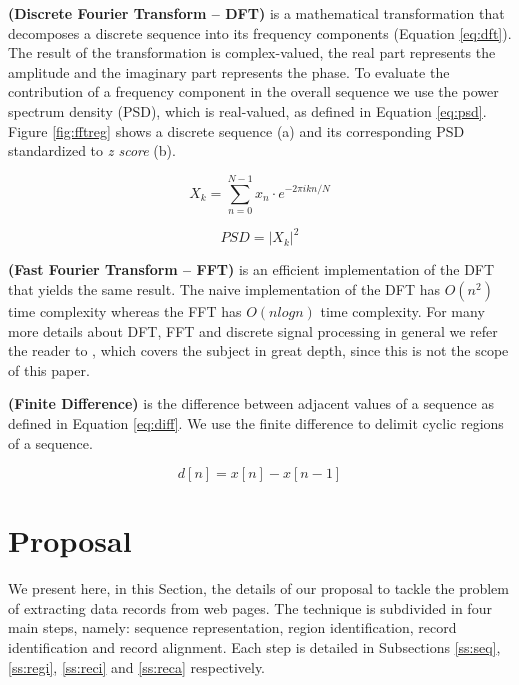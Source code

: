 \documentclass{vldb}
\begin{document}
\begin{definition}\textbf{(Discrete Fourier Transform -- DFT)} is a mathematical
transformation that decomposes a discrete sequence into its frequency components
(Equation \ref{eq:dft}). The result of the transformation is complex-valued, the
real part represents the amplitude and the imaginary part represents the phase.
To evaluate the contribution of a frequency component in the overall sequence we
use the power spectrum density (PSD), which is real-valued, as defined in
Equation \ref{eq:psd}.
Figure \ref{fig:fftreg} shows a discrete sequence (a) and its corresponding PSD
standardized to \textit{z score} (b).

\begin{equation}\label{eq:dft}
    X_k=\sum_{n=0}^{N-1}{x_n\cdot e^{-2\pi ikn/N}}    
\end{equation}

\begin{equation}\label{eq:psd}
    PSD=|X_k|^2
\end{equation}

\end{definition}

\begin{definition}\textbf{(Fast Fourier Transform -- FFT)}\label{def:fft} is an
efficient implementation of the DFT that yields the same result. The naive implementation
of the DFT has $O(n^2)$ time complexity whereas the FFT has $O(nlogn)$ time
complexity. For many more details about DFT, FFT and discrete signal
processing in general we refer the reader to \cite{oppenheim1989discrete},
which covers the subject in great depth, since this is not the scope of this
paper.
\end{definition}

\begin{definition}\textbf{(Finite Difference)}\label{def:diff} is the difference
between adjacent values of a sequence as defined in Equation \ref{eq:diff}. We use the
finite difference to delimit cyclic regions of a sequence.

\begin{equation}\label{eq:diff}
    d[n] = x[n] - x[n - 1]
\end{equation}
\end{definition}

\section{Proposal}\label{sec:prop}
We present here, in this Section, the details of our proposal to tackle the
problem of extracting data records from web pages. The technique is subdivided
in four main steps, namely: sequence representation, region identification,
record identification and record alignment. Each step is detailed in Subsections
\ref{ss:seq}, \ref{ss:regi}, \ref{ss:reci} and \ref{ss:reca} respectively.
\end{document}
